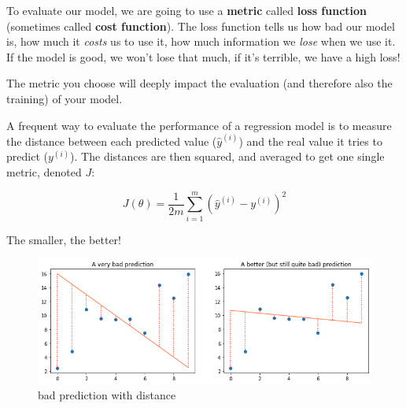 To evaluate our model, we are going to use a \textbf{metric} called \textbf{loss function} (sometimes called \textbf{cost function}).
The loss function tells us how bad our model is, how much it \textit{costs} us to use it, how much information we \textit{lose} when we use it.
If the model is good, we won't lose that much, if it's terrible, we have a high loss!

The metric you choose will deeply impact the evaluation (and therefore also the training) of your model.

A frequent way to evaluate the performance of a regression model is to measure the distance between each predicted value ($\hat{y}^{(i)}$) and the real value it tries to predict (${y}^{(i)}$). The distances are then squared, and averaged to get one single metric, denoted $J$:

$$
J(\theta) = \frac{1}{2m}\sum_{i=1}^{m}(\hat{y}^{(i)} - y^{(i)})^2
$$

The smaller, the better! 

\begin{figure}[h!]
  \centering
  \includegraphics[scale=0.55]{assets/bad_pred_with_distance.png}
  \caption{bad prediction with distance}
\end{figure}
